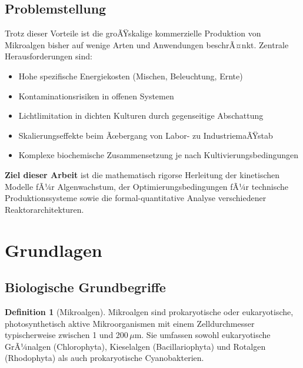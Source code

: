 ﻿\documentclass[a4paper,12pt]{article}
\theoremstyle{definition}
\newtheorem{definition}{Definition}
\begin{document}
\subsection{Problemstellung}

Trotz dieser Vorteile ist die groÃŸskalige kommerzielle Produktion von Mikroalgen bisher
auf wenige Arten und Anwendungen beschrÃ¤nkt. Zentrale Herausforderungen sind:

\begin{itemize}
	\item Hohe spezifische Energiekosten (Mischen, Beleuchtung, Ernte)
	\item Kontaminationsrisiken in offenen Systemen
	\item Lichtlimitation in dichten Kulturen durch gegenseitige Abschattung
	\item Skalierungseffekte beim Ãœbergang von Labor- zu IndustriemaÃŸstab
	\item Komplexe biochemische Zusammensetzung je nach Kultivierungsbedingungen
\end{itemize}

\textbf{Ziel dieser Arbeit} ist die mathematisch rigorse Herleitung der kinetischen
Modelle fÃ¼r Algenwachstum, der Optimierungsbedingungen fÃ¼r technische Produktionssysteme
sowie die formal-quantitative Analyse verschiedener Reaktorarchitekturen.

\section{Grundlagen}

\subsection{Biologische Grundbegriffe}

\begin{definition}[Mikroalgen]
	Mikroalgen sind prokaryotische oder eukaryotische, photosynthetisch aktive
	Mikroorganismen mit einem Zelldurchmesser typischerweise zwischen 1 und 200\,$\mu$m.
	Sie umfassen sowohl eukaryotische GrÃ¼nalgen (Chlorophyta), Kieselalgen (Bacillariophyta)
	und Rotalgen (Rhodophyta) als auch prokaryotische Cyanobakterien.
\end{definition}
\end{document}
